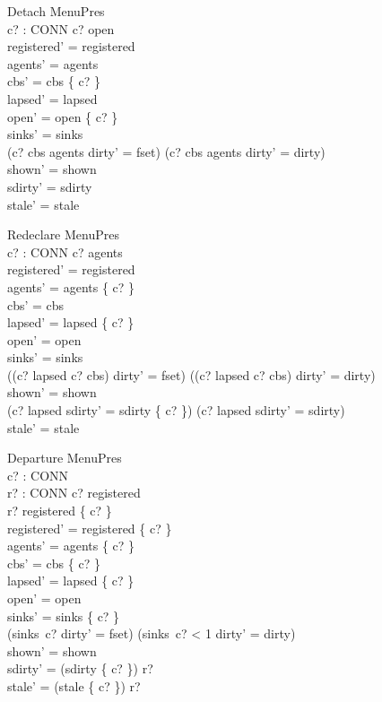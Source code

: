 \documentclass[a4paper,10pt,fleqn]{article}
\begin{document}
\begin{schema}{Detach}
  \Delta MenuPres \\
  c? : CONN
\where
  c? \in open \\
  registered' = registered \\
  agents' = agents \\
  cbs' = cbs \setminus \{ c? \} \\
  lapsed' = lapsed \\
  open' = open \setminus \{ c? \} \\
  sinks' = sinks \\
  (c? \in cbs \setminus agents \land dirty' = fset) \lor
    (c? \notin cbs \setminus agents \land dirty' = dirty) \\
  shown' = shown \\
  sdirty' = sdirty \\
  stale' = stale
\end{schema}

\begin{schema}{Redeclare}
  \Delta MenuPres \\
  c? : CONN
\where
  c? \in agents \\
  registered' = registered \\
  agents' = agents \setminus \{ c? \} \\
  cbs' = cbs \\
  lapsed' = lapsed \setminus \{ c? \} \\
  open' = open \\
  sinks' = sinks \\
  ((c? \in lapsed \lor c? \notin cbs) \land dirty' = fset) \lor
    (\lnot (c? \in lapsed \lor c? \notin cbs) \land dirty' = dirty) \\
  shown' = shown \\
  (c? \in lapsed \land sdirty' = sdirty \cup \{ c? \}) \lor
    (c? \notin lapsed \land sdirty' = sdirty) \\
  stale' = stale
\end{schema}

\begin{schema}{Departure}
  \Delta MenuPres \\
  c? : CONN \\
  r? : \power CONN
\where
  c? \in registered \\
  r? \subseteq registered \setminus \{ c? \} \\
  registered' = registered \setminus \{ c? \} \\
  agents' = agents \setminus \{ c? \} \\
  cbs' = cbs \setminus \{ c? \} \\
  lapsed' = lapsed \setminus \{ c? \} \\
  open' = open \\
  sinks' = sinks \oplus \{ c?  \} \\
  (sinks~c?  \land dirty' = fset) \lor
    (sinks~c? < 1 \land dirty' = dirty) \\
  shown' = shown \\
  sdirty' = (sdirty \setminus \{ c? \}) \cup r? \\
  stale' = (stale \setminus \{ c? \}) \cup r?
\end{schema}
\end{document}
